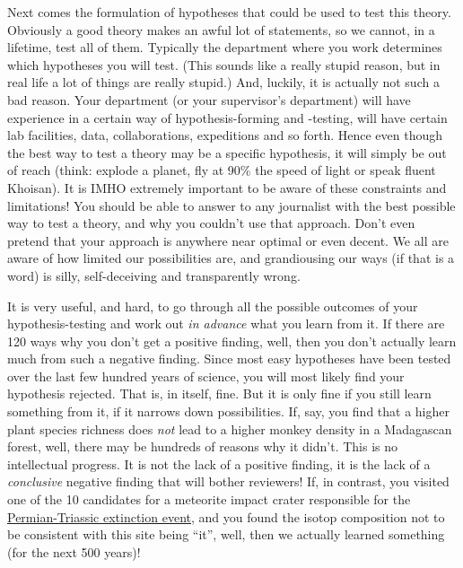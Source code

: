 Next comes the formulation of hypotheses that could be used to test this theory. Obviously a good theory makes an awful lot of statements, so we cannot, in a lifetime, test all of them. Typically the department where you work determines which hypotheses you will test. (This sounds like a really stupid reason, but in real life a lot of things are really stupid.) And, luckily, it is actually not such a bad reason. Your department (or your supervisor's department) will have experience in a certain way of hypothesis-forming and -testing, will have certain lab facilities, data, collaborations, expeditions and so forth. Hence even though the best way to test a theory may be a specific hypothesis, it will simply be out of reach (think: explode a planet, fly at 90\% the speed of light or speak fluent Khoisan). It is IMHO extremely important to be aware of these constraints and limitations! You should be able to answer to any journalist with the best possible way to test a theory, and why you couldn't use that approach. Don't even pretend that your approach is anywhere near optimal or even decent. We all are aware of how limited our possibilities are, and grandiousing our ways (if that is a word) is silly, self-deceiving and transparently wrong.

It is very useful, and hard, to go through all the possible outcomes of your hypothesis-testing and work out \emph{in advance} what you learn from it. If there are 120 ways why you don't get a positive finding, well, then you don't actually learn much from such a negative finding. Since most easy hypotheses have been tested over the last few hundred years of science, you will most likely find your hypothesis rejected. That is, in itself, fine. But it is only fine if you still learn something from it, if it narrows down possibilities. If, say, you find that a higher plant species richness does \emph{not} lead to a higher monkey density in a Madagascan forest, well, there may be hundreds of reasons why it didn't. This is no intellectual progress. It is not the lack of a positive finding, it is the lack of a \emph{conclusive} negative finding that will bother reviewers! If, in contrast, you visited one of the 10 candidates for a meteorite impact crater responsible for the \href{https://en.wikipedia.org/wiki/Permian%E2%80%93Triassic_extinction_event}{Permian-Triassic extinction event}, 
and you found the isotop composition not to be consistent with this site being ``it'', well, then we actually learned something (for the next 500 years)!

